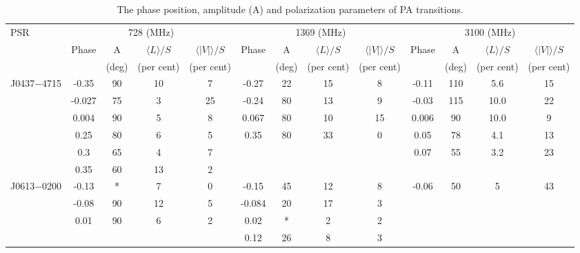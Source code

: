 \documentclass[useAMS,usenatbib]{mn2e}
\begin{document}
\begin{table}
\centering
\caption{The phase position, amplitude (A) and polarization parameters of PA transitions.}
\label{tran}
\begin{tabular}{lcccccccccccc}
\hline
PSR  &  \multicolumn{4}{c}{728 (MHz)} & \multicolumn{4}{c}{1369 (MHz)} & \multicolumn{4}{c}{3100 (MHz)}\\
     & Phase & A & $\langle L \rangle/S$ & $\langle|V|\rangle/S$ & Phase & A & $\langle L \rangle/S$ & $\langle|V|\rangle/S$ & Phase & A & $\langle L \rangle/S$ & $\langle|V|\rangle/S$ \\
	   &       & (deg)            &  (per cent)           &  (per cent)           &       & (deg)           &  (per cent)           &  (per cent)           &       & (deg)            &  (per cent)            &  (per cent)          \\ 
\hline
J0437$-$4715    &  -0.35 & 90         & 10    & 7    &  -0.27 &  22        & 15      & 8       & -0.11  & 110        & 5.6    & 15    \\
                & -0.027 & 75         & 3     & 25   &  -0.24 &  80        & 13      & 9       & -0.03  & 115        & 10.0   & 22    \\
                &  0.004 & 90         & 5     & 8    & 0.067  &  80        & 10      & 15      & 0.006  & 90         & 10.0   & 9      \\
                &  0.25  & 80         & 6     & 5    & 0.35   &  80        & 33      & 0       & 0.05   & 78         & 4.1    & 13    \\
                &  0.3   & 65         & 4     & 7    &        &            &         &         & 0.07   & 55         & 3.2    & 23     \\
                &  0.35  & 60         & 13    & 2    &        &            &         &         &        &            &        &        \\
J0613$-$0200    & -0.13  & *          & 7     & 0    & -0.15  &  45        & 12      & 8       & -0.06  & 50         &  5     &  43   \\
                & -0.08  & 90         & 12    & 5    & -0.084 &  20        & 17      & 3       &        &            &        &       \\
                &  0.01  & 90         & 6     & 2    & 0.02   & *          & 2       & 2       &        &            &        &        \\
                &        &            &       &      & 0.12   &  26        & 8       & 3       &        &            &        &       \\

\end{tabular}
\end{table}
\end{document}
